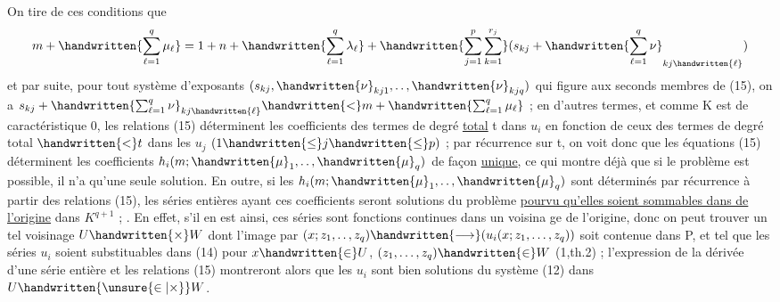 On tire de ces conditions que
\[
m+\handwritten{\sum_{\ell=1}^{q}\mu_\ell}=1+n+\handwritten{\sum_{\ell=1}^{q}\lambda_\ell}+\handwritten{\sum_{j=1}^{p}\sum_{k=1}^{r_j}}(s_{kj}+\handwritten{\sum_{\ell=1}^{q}\nu}_{kj\handwritten{\ell}})
\]
et par suite, pour tout système d'exposants $(s_{kj},\handwritten{\nu}_{kj1},\mathinner{\ldotp\ldotp},\handwritten{\nu}_{kjq})$ qui figure aux seconds membres de (15), on a $s_{kj}+\handwritten{\sum_{\ell=1}^{q}\nu}_{kj\handwritten{\ell}}\handwritten{<}m+\handwritten{\sum_{\ell=1}^{q}\mu_\ell}$ ; en d'autres termes, et comme K est de caractéristique 0, les relations (15) déterminent les coefficients des termes de degré \uline{total} t dans $u_i$ en fonction de ceux des termes de degré total $\handwritten{<}t$ dans les $u_j$ $(1\handwritten{\leq}j\handwritten{\leq}p)$ ; par récurrence sur t, on voit donc que les équations (15) déterminent les coefficients $h_i(m;\handwritten{\mu}_1,\mathinner{\ldotp\ldotp},\handwritten{\mu}_q)$ de façon \uline{unique}, ce qui montre déjà que si le problème est possible, il n'a qu'une seule solution. En outre, si les $h_i(m;\handwritten{\mu}_1,\mathinner{\ldotp\ldotp},\handwritten{\mu}_q)$ sont déterminés par récurrence à partir des relations (15), les séries entières ayant ces coefficients seront solutions du problème \uline{pourvu qu'elles soient sommables dans  de l'origine} dans $K^{q+1}$ ; . En effet, s'il en est ainsi, ces séries sont fonctions continues dans un voisina ge de l'origine, donc on peut trouver un tel voisinage $U\handwritten{\times}W$ dont l'image par $(x;z_1,\mathinner{\ldotp\ldotp},z_q)\handwritten{\longrightarrow}(u_i(x;z_1,\ldots,z_q))$ soit contenue dans P, et tel que les séries $u_i$ soient substituables dans (14) pour $x\handwritten{\in}U$, $(z_1,\ldots,z_q)\handwritten{\in}W$ (1,th.2) ; l'expression de la dérivée d'une série entière et les relations (15) montreront alors que les $u_i$ sont bien solutions du système (12) dans $U\handwritten{\unsure{\in|\times}}W$.

